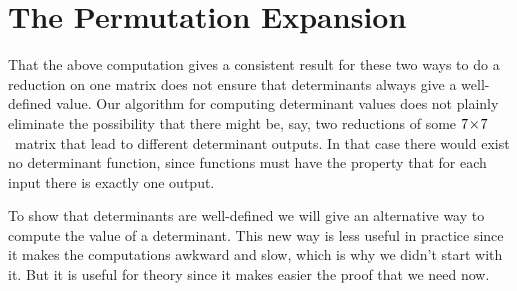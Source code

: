 \documentclass[10pt,t]{beamer}
\begin{document}
\section{The Permutation Expansion}
\begin{frame}
\end{frame}
\begin{frame}
That the above computation gives a consistent result for these two
ways to do a reduction on one matrix does not ensure that determinants
always give a well-defined value.
Our algorithm for computing determinant values does not
plainly eliminate the possibility that there might be, say,
two reductions of some $7 \! \times \! 7$~matrix that lead to different 
determinant outputs.
In that case there would exist no determinant function, 
since functions must have the property
that for each input there is exactly one output. 

\pause
To show that determinants are well-defined 
we will give an alternative way to compute
the value of a determinant. 
This new way is less useful in practice since it 
makes the computations awkward and slow, which is why we didn't start with it.
But it is useful for theory since it makes easier the proof that we need 
now.
\end{frame}
\end{document}
